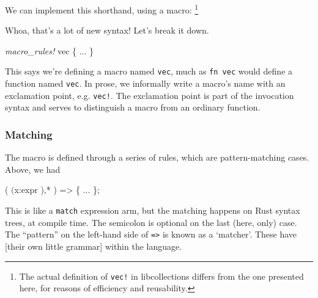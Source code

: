 \documentclass[a4paper,]{book}
\newenvironment{Shaded}{\begin{snugshade}}{\end{snugshade}}
\newcommand{\KeywordTok}[1]{\textcolor[rgb]{0.13,0.29,0.53}{\textbf{{#1}}}}
\newcommand{\DataTypeTok}[1]{\textcolor[rgb]{0.13,0.29,0.53}{{#1}}}
\newcommand{\PreprocessorTok}[1]{\textcolor[rgb]{0.56,0.35,0.01}{\textit{{#1}}}}
\newcommand{\NormalTok}[1]{{#1}}
\begin{document}
We can implement this shorthand, using a macro: \footnote{The actual
  definition of \texttt{vec!} in libcollections differs from the one
  presented here, for reasons of efficiency and reusability.}

\begin{Shaded}
\end{Shaded}

Whoa, that's a lot of new syntax! Let's break it down.

\begin{Shaded}
\begin{Highlighting}[]
\PreprocessorTok{macro_rules!} \NormalTok{vec \{ ... \}}
\end{Highlighting}
\end{Shaded}

This says we're defining a macro named \texttt{vec}, much as
\texttt{fn\ vec} would define a function named \texttt{vec}. In prose,
we informally write a macro's name with an exclamation point, e.g.
\texttt{vec!}. The exclamation point is part of the invocation syntax
and serves to distinguish a macro from an ordinary function.

\subsubsection{Matching}\label{matching}

The macro is defined through a series of rules, which are
pattern-matching cases. Above, we had

\begin{Shaded}
\begin{Highlighting}[]
\NormalTok{( $( $x:expr ),* ) => \{ ... \};}
\end{Highlighting}
\end{Shaded}

This is like a \texttt{match} expression arm, but the matching happens
on Rust syntax trees, at compile time. The semicolon is optional on the
last (here, only) case. The ``pattern'' on the left-hand side of
\texttt{=\textgreater{}} is known as a `matcher'. These have {[}their
own little grammar{]} within the language.
\end{document}
